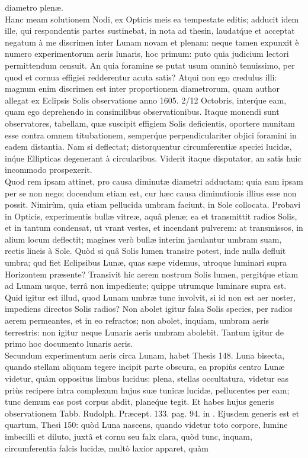 \documentclass[a4paper, 11pt, oneside, polutonikogreek, german]{article}
\begin{document}
diametro plenæ.\\\hspace*{5mm}Hanc meam solutionem Nodi, ex Opticis meis ea tempestate editis; adducit idem ille, qui respondentis partes sustinebat, in nota ad thesin, laudat\'que et acceptat negatum à me discrimen inter Lunam novam et plenam: neque tamen expunxit è numero experimentorum aeris lunaris, hoc primum: puto quia judicium lectori permittendum censuit. An quia foramine se putat usum omninò tenuissimo, per quod et cornua effigiei redderentur acuta satis? Atqui non ego credulus illi: magnum enim discrimen est inter proportionem diametrorum, quam author allegat ex Eclipsis Solis observatione anno 1605. 2/12 Octobris, inter\'que eam, quam ego deprehendo in consimilibus observationibus. Itaque monendi sunt observatores, tabellam, quæ suscipit effigiem Solis deficientis, oportere munitam esse contra omnem titubationem, semper\'que perpendiculariter objici foramini in eadem distantia. Nam si deflectat; distorquentur circumferentiæ speciei lucidæ, in\'que Ellipticas degenerant à circularibus. Viderit itaque disputator, an satis huic incommodo prospexerit.\\\hspace*{5mm}Quod rem ipsam attinet, pro causa diminutæ diametri adductam: quia eam ipsam per se non nego; docendum etiam est, cur hæc causa diminutionis illius esse non possit. Nimirùm, quia etiam pellucida umbram faciunt, in Sole collocata. Probavi in Opticis, experimentis bullæ vitreæ, aquâ plenæ; ea et transmittit radios Solis, et in tantum condensat, ut vrant vestes, et incendant pulverem: at transmissos, in alium locum deflectit; magines verò bullæ interim jaculantur umbram suam, rectis lineis à Sole. Quòd si quâ Solis lumen transire potest, inde nulla defluit umbra; qud fiet Eclipsibus Lunæ, quas sæpe videmus, utroque luminari supra Horizontem præsente? Transivit hic aerem nostrum Solis lumen, pergit\'que etiam ad Lunam usque, terrâ non impediente; quippe utrumque luminare supra est. Quid igitur est illud, quod Lunam umbræ tunc involvit, si id non est aer noster, impediens directos Solis radios? Non abolet igitur falsa Solis species, per radios aerem permeantes, et in eo refractos; non abolet, inquiam, umbram aeris terrestris: non igitur neque Lunaris aeris umbram abolebit. Tantum igitur de primo hoc documento lunaris aeris.\\\hspace*{5mm}Secundum experimentum aeris circa Lunam, habet Thesis 148. Luna bisecta, quando stellam aliquam tegere incipit parte obscura, ea propiùs centro Lunæ videtur, quàm oppositus limbus lucidus: plena, stellas occultatura, videtur eas priùs recipere intra complexum hujus suæ tunicæ lucidæ, pellucentes per eam; tunc demum eas post corpus abdit, plane\'que tegit. Et habes hujus generis observationem Tabb. Rudolph. Præcept. 133. pag. 94. in \mars\hspace*{0.5mm}\rightmoon\hspace*{0.5mm}\venus. Ejusdem generis est et quartum, Thesi 150: quòd Luna nascens, quando videtur toto corpore, lumine imbecilli et diluto, juxtâ et cornu seu falx clara, quòd tunc, inquam, circumferentia falcis lucidæ, multò laxior apparet, quàm 
\end{document}
